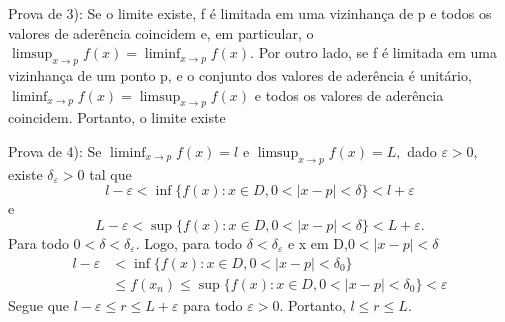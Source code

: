 \documentclass[analysis_notes.tex]{subfiles}
\begin{document}
\begin{proof*}
	Prova de 3): Se o limite existe, f \'e limitada em uma vizinhan\c ca de p e todos os valores de ader\^encia coincidem e,
	em particular, o $\limsup_{x\to p}f(x) = \liminf_{x\to p}f(x).$ Por outro lado, se f \'e limitada em uma vizinhan\c ca de um ponto p,
	e o conjunto dos valores de ader\^encia \'e unit\'ario, $\liminf_{x\to p}f(x)=\limsup_{x\to p}f(x)$ e todos os valores de ader\^encia
	coincidem. Portanto, o limite existe

	Prova de 4): Se $\liminf_{x\to p}f(x) = l$ e $\limsup_{x\to p}f(x) = L,$ dado $\varepsilon > 0,$ existe $\delta_{\varepsilon}>0$
	tal que
	$$
		l - \varepsilon < \inf{\{f(x):x\in D, 0<|x-p|<\delta\}} < l + \varepsilon
	$$
	e
	$$
		L - \varepsilon < \sup{\{f(x):x\in D, 0<|x-p|<\delta\}} < L + \varepsilon.
	$$
	Para todo $0<\delta<\delta_{\varepsilon}.$  Logo, para todo $\delta<\delta_{\varepsilon}$ e x em D,$0<|x-p|<\delta$
	\begin{align*}
		l - \varepsilon & < \inf\{f(x):x\in D, 0 < |x-p| < \delta_{0}\}                              \\
		                & \leq{}f(x_{n})\leq{}\sup\{f(x):x\in D, 0 <|x-p|<\delta_{0}\} < \varepsilon
	\end{align*}
	Segue que $l-\varepsilon\leq{r}\leq{L+\varepsilon}$ para todo $\varepsilon > 0$. Portanto, $l\leq{r}\leq{L}.$
\end{proof*}
\end{document}
